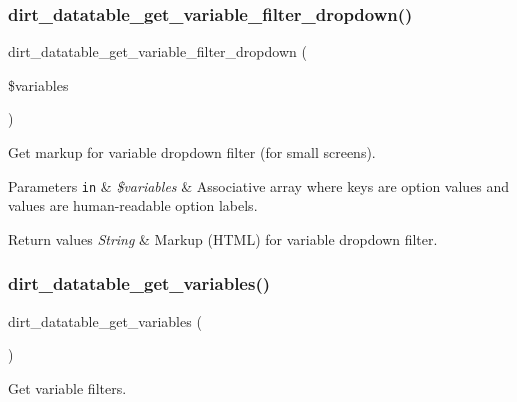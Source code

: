 \subsubsection{\texorpdfstring{dirt\+\_\+datatable\+\_\+get\+\_\+variable\+\_\+filter\+\_\+dropdown()}{dirt\_datatable\_get\_variable\_filter\_dropdown()}}
{\footnotesize\ttfamily dirt\+\_\+datatable\+\_\+get\+\_\+variable\+\_\+filter\+\_\+dropdown (\begin{DoxyParamCaption}\item[{}]{\$variables }\end{DoxyParamCaption})}

Get markup for variable dropdown filter (for small screens).


\begin{DoxyParams}[1]{Parameters}
\mbox{\tt in}  & {\em \$variables} & Associative array where keys are option values and values are human-\/readable option labels.\\
\hline
\end{DoxyParams}

\begin{DoxyRetVals}{Return values}
{\em String} & Markup (H\+T\+ML) for variable dropdown filter. \\
\hline
\end{DoxyRetVals}
\mbox{\label{dirt__datatable_8data__search__portal_8inc_a13fd248b4d46c910182783601b98040d}} 
\subsubsection{\texorpdfstring{dirt\+\_\+datatable\+\_\+get\+\_\+variables()}{dirt\_datatable\_get\_variables()}}
{\footnotesize\ttfamily dirt\+\_\+datatable\+\_\+get\+\_\+variables (\begin{DoxyParamCaption}{ }\end{DoxyParamCaption})}

Get variable filters.



